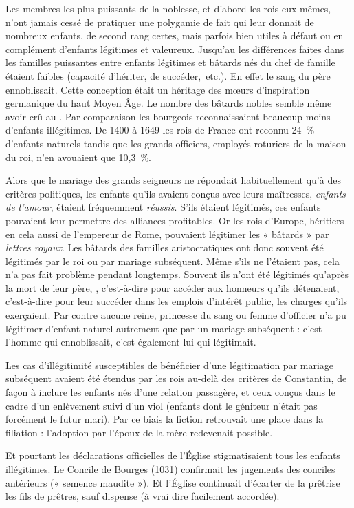  Les membres les plus puissants de la noblesse, et d'abord les rois eux-mêmes, n'ont jamais cessé de pratiquer une polygamie de fait qui leur donnait de nombreux enfants, de second rang certes, mais parfois bien utiles à défaut ou en complément d'enfants légitimes et valeureux. Jusqu'au  les différences faites dans les familles puissantes entre enfants légitimes et bâtards nés du chef de famille étaient faibles (capacité d'hériter, de succéder,~etc.). En effet le sang du père ennoblissait. Cette conception était un héritage des mœurs d'inspiration germanique du haut Moyen Âge. Le nombre des bâtards nobles semble même avoir crû au  . Par comparaison les bourgeois reconnaissaient beaucoup moins d'enfants illégitimes. De 1400 à 1649 les rois de France ont reconnu 24~\% d'enfants naturels tandis que les grands officiers, employés roturiers de la maison du roi, n'en avouaient que 10,3~\%. 

 Alors que le mariage des grands seigneurs ne répondait habituellement qu'à des critères politiques, les enfants qu'ils avaient conçus avec leurs maîtresses, \emph{enfants de l'amour}, étaient fréquemment \emph{réussis}. S'ils étaient légitimés, ces enfants pouvaient leur permettre des alliances profitables. Or les rois d'Europe, héritiers en cela aussi de l'empereur de Rome, pouvaient légitimer les « bâtards » par \emph{lettres royaux}. Les bâtards des familles aristocratiques ont donc souvent été légitimés par le roi ou par mariage subséquent. Même s'ils ne l'étaient pas, cela n'a pas fait problème pendant longtemps. Souvent ils n'ont été légitimés qu'après la mort de leur père, , c'est-à-dire pour accéder aux honneurs qu'ils détenaient, c'est-à-dire pour leur succéder dans les emplois d'intérêt public, les charges qu'ils exerçaient. Par contre aucune reine, princesse du sang ou femme d'officier n'a pu légitimer d'enfant naturel autrement que par un mariage subséquent : c'est l'homme qui ennoblissait, c'est également lui qui légitimait. 

 Les cas d'illégitimité susceptibles de bénéficier d'une légitimation par mariage subséquent avaient été étendus par les rois au-delà des critères de Constantin, de façon à inclure les enfants nés d'une relation passagère, et ceux conçus dans le cadre d'un enlèvement suivi d'un viol (enfants dont le géniteur n'était pas forcément le futur mari). Par ce biais la fiction retrouvait une place dans la filiation : l'adoption par l'époux de la mère redevenait possible. 

 Et pourtant les déclarations officielles de l'Église stigmatisaient tous les enfants illégitimes. Le Con\-ci\-le de Bourges (1031) confirmait les jugements des conciles antérieurs (« semence maudite »). Et l'Église continuait d'écarter de la prêtrise les fils de prêtres, sauf dispense (à vrai dire facilement accordée). 

